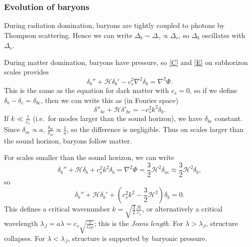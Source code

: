 \documentclass{jknotes}
\begin{document}
\subsubsection*{Evolution of baryons}
During radiation domination, baryons are tightly coupled to photons by Thompson scattering. Hence we can write \(\Delta_b \sim \Delta_\gamma \propto \Delta_r\), so \(\Delta_b\) oscillates with \(\Delta_r\).

During matter domination, baryons have pressure, so \eqref{C} and \eqref{E} on subhorizon scales provides
\begin{equation}
    \delta_b'' + \mathcal{H}\delta_b' - c_s^2\nabla^2\delta_b = \nabla^2\Phi.
\end{equation}
This is the same as the equation for dark matter with \(c_s=0\), so if we define \(\delta_b-\delta_c = \delta_{bc}\), then we can write this as (in Fourier space)
\begin{equation}
    \delta''_{bc} + \mathcal{H}\delta'_{bc} = -c_s^2k^2\delta_b.
\end{equation}
If \(k\ll\frac{1}{c_s}\) (i.e.\ for modes larger than the sound horizon), we have \(\delta_{bc}\) constant. Since \(\delta_m \propto a\), \(\frac{\delta_{bc}}{\delta_m}\propto\frac1a\), so the difference is negligible. Thus on scales larger than the sound horizon, baryons follow matter. 

For scales smaller than the sound horizon, we can write
\begin{equation}
    \delta_b'' + \mathcal{H}\delta_b + c_s^2k^2\delta_b = \nabla^2\Phi = \frac32\mathcal{H}^2\delta_m \approx \frac32\mathcal{H}^2\delta_b,
\end{equation}
so
\begin{equation}
    \delta_b'' + \mathcal{H}\delta_b' + \left(c_s^2 k^2 - \frac32\mathcal{H}^2\right)\delta_b = 0.
\end{equation}
This defines a critical wavenumber \(k=\sqrt{\frac32}\frac{\mathcal{H}}{c_s}\), or alternatively a critical wavelength \(\lambda_J = a\lambda = c_s\sqrt{\frac{\pi}{G\bar{\rho}}}\); this is the \emph{Jeans length}. For \(\lambda>\lambda_J\), structure collapses. For \(\lambda < \lambda_J\), structure is supported by baryonic pressure.
\end{document}
